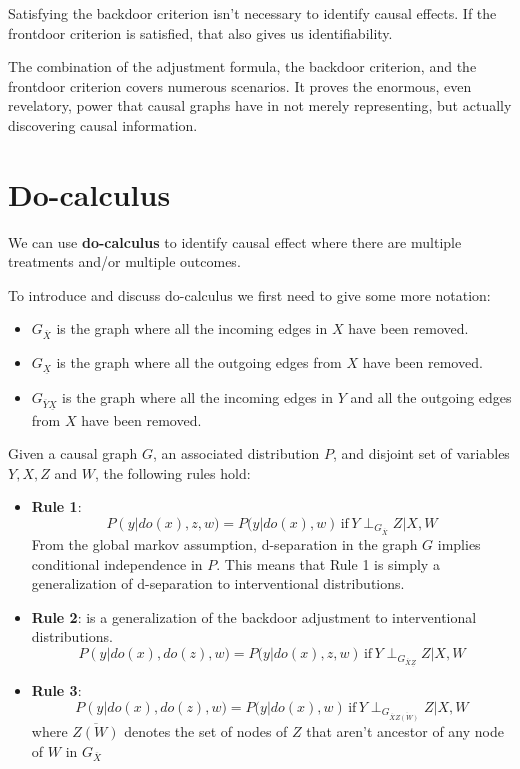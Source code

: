 Satisfying the backdoor criterion isn't necessary to identify causal effects. If the 
frontdoor criterion is satisfied, that also gives us identifiability.

The combination of the adjustment formula, the backdoor criterion, and the frontdoor 
criterion covers numerous scenarios. It proves the enormous, even revelatory, power 
that causal graphs have in not merely representing, but actually discovering causal
information.
\section{Do-calculus}
We can use \textbf{do-calculus} to identify causal effect where there are multiple 
treatments and/or multiple outcomes. 

To introduce and discuss do-calculus we first need to give some more notation:
\begin{itemize}
    \item $G_{\overline{X}}$ is the graph where all the incoming edges in $X$ have been removed.
    \item $G_{\underline{X}}$ is the graph where all the outgoing edges from $X$ have been removed.
    \item $G_{\overline{Y}\underline{X}}$ is the graph where all the incoming edges in $Y$ and all the outgoing edges from $X$ have been removed. 
\end{itemize}
\begin{definition}
    Given a causal graph $G$, an associated distribution $P$, and disjoint set of variables $Y, X, Z$ and $W$, the following rules hold:
    \begin{itemize}
        \item \textbf{Rule 1}:
            \begin{equation}
                P(y | do(x), z, w) = P(y | do(x), w) \, \text{if} \, Y \perp_{G_{\overline{X}}} Z | X, W
            \end{equation}
            From the global markov assumption, d-separation in the graph $G$ implies conditional independence in $P$. This means that Rule 1 is simply a generalization of d-separation to interventional distributions.
        \item \textbf{Rule 2}: is a generalization of the backdoor adjustment to interventional distributions.
            \begin{equation}
                P(y | do(x), do(z), w) = P(y | do(x), z, w) \, \text{if} \, Y \perp_{G_{\overline{X}\underline{Z}}} Z | X, W
            \end{equation}
        \item \textbf{Rule 3}:
            \begin{equation}
                P(y | do(x), do(z), w) = P(y | do(x), w) \, \text{if} \, Y \perp_{G_{\overline{X}\overline{Z(W)}}} Z | X, W
            \end{equation}
            where $\overline{Z(W)}$ denotes the set of nodes of $Z$ that aren't ancestor of any node of $W$ in $G_{\overline{X}}$
    \end{itemize}
\end{definition}

